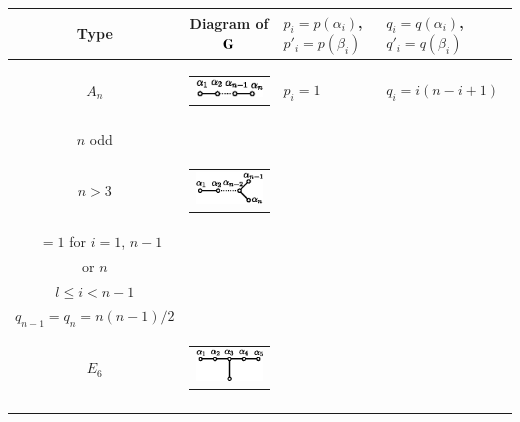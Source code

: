 {
\tabcolsep=1.5pt
\fontsize{9}{11}\selectfont
\setcounter{table}{0}
\begin{longtable}{@{}|c|c|l|l|@{}}
\hline
Type & Diagram of $\mathbf{G}$ & \;\; $p_i = p (\alpha_i)$, $p'_i = p (\beta_i)$ & \; $q_i = q (\alpha_i)$, $q'_i = q(\beta_i)$\\\hline
$A_n$ & 
\begin{tabular}{c}
{\includegraphics[scale=0.8]{318a.eps}}
\end{tabular} & \; $p_i = 1$ & $q_i = i (n-i+1)$\\\hline
\begin{tabular}{c}
$D_n$\\
$n$ odd \\
$n > 3$
\end{tabular} & 
\begin{tabular}{c}
{\includegraphics[scale=0.8]{318b.eps}}
\end{tabular} & 
\begin{tabular}{l}
$p_i = 2$ for $1 < i < n -1$ \\
\quad~ $= 1 $ for  $i = 1$, $n - 1$\\
\hspace{2cm} or $n$
\end{tabular} & 
\begin{tabular}{l}
$q_i = i (2n - i - 1)$\\
\qquad $l \leqslant i < n - 1$\\
$q_{n-1} = q_n = n (n -1) / 2$
\end{tabular}\\\hline
$E_6$ & 
\begin{tabular}{c}
{\includegraphics[scale=0.8]{318c.eps}}
\end{tabular}&
\begin{tabular}{l}
$p_1 = p_5 = 1 $, $p_2 = p_4 = $\\

\end{tabular}
\end{longtable}}
